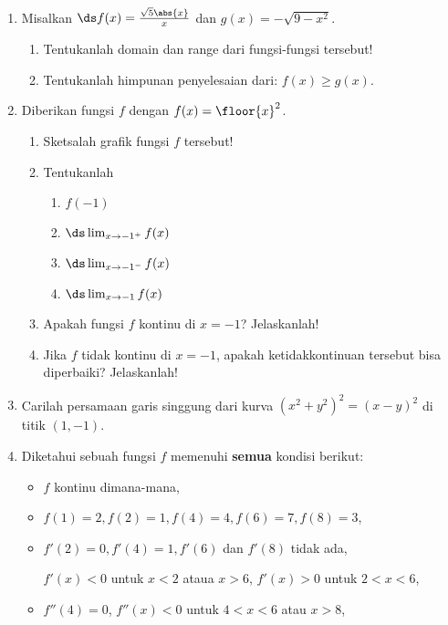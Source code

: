 \begin{enumerate}[leftmargin=*, label={\arabic*}.]
\item Misalkan $\ds f(x) = \frac{\sqrt{5}\abs{x}}{x}$ dan $g(x) = -\sqrt{9-x^{2}}$.
\begin{enumerate}[label={\alph*}.]
    \item Tentukanlah domain dan range dari fungsi-fungsi tersebut!
    \item Tentukanlah himpunan penyelesaian dari: $f(x) \geq g(x)$.
\end{enumerate}
\item Diberikan fungsi $f$ dengan $f(x) = \floor{x}^2$.
\begin{enumerate}[label={\alph*}.]
    \item Sketsalah grafik fungsi $f$ tersebut!
    \item Tentukanlah
    \begin{enumerate}[label={\roman*}.]
        \item $f(-1)$
        \item $\ds\lim_{x\to -1^{+}} f(x)$
        \item $\ds\lim_{x\to -1^{-}} f(x)$
        \item $\ds\lim_{x\to -1} f(x)$
    \end{enumerate}
    \item Apakah fungsi $f$ kontinu di $x=-1$? Jelaskanlah!
    \item Jika $f$ tidak kontinu di $x=-1$, apakah ketidakkontinuan tersebut bisa 
    diperbaiki? Jelaskanlah!
\end{enumerate}
\item Carilah persamaan garis singgung dari kurva $(x^2+y^2)^2=(x-y)^2$ di titik $(1,-1)$.
\item Diketahui sebuah fungsi $f$ memenuhi \textbf{semua} kondisi berikut:
\begin{itemize}
    \item $f$ kontinu dimana-mana,
    \item $f(1)=2,f(2)=1,f(4)=4,f(6)=7,f(8)=3$,
    \item $f'(2)=0,f'(4)=1,f'(6)$ dan $f'(8)$ tidak ada,
    
    $f'(x)<0$ untuk $x < 2$ ataua $x>6$, $f'(x)>0$ untuk $2<x<6$,
    \item $f''(4) = 0$, $f''(x)<0$ untuk $4<x<6$ atau $x > 8$,
    

\end{itemize}
\end{enumerate}
